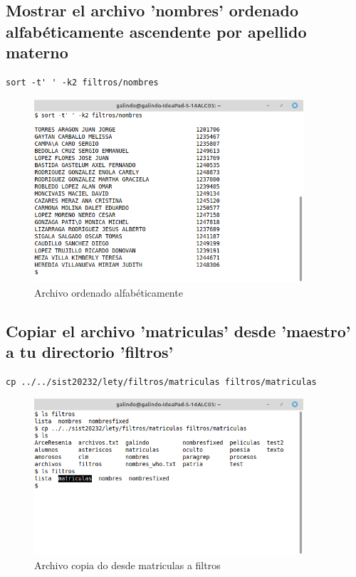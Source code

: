 \documentclass[11pt]{article}
\begin{document}
\pagebreak

\subsection{Mostrar el archivo 'nombres' ordenado alfabéticamente ascendente por apellido materno}
\label{sec:org0f2da5d}
\begin{verbatim}
sort -t' ' -k2 filtros/nombres
\end{verbatim}

\begin{figure}[htbp]
\centering
\includegraphics[width=10cm]{img/a4.png}
\caption{Archivo ordenado alfabéticamente}
\end{figure}

\cite{sort}

\subsection{Copiar el archivo 'matriculas' desde 'maestro' a tu directorio 'filtros'}
\label{sec:org2de80ad}
\begin{verbatim}
cp ../../sist20232/lety/filtros/matriculas filtros/matriculas
\end{verbatim}

\begin{figure}[htbp]
\centering
\includegraphics[width=10cm]{img/a5.png}
\caption{Archivo copia do desde matriculas a filtros}
\end{figure}
\end{document}
